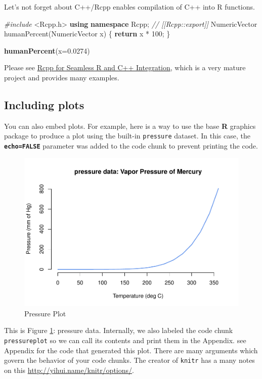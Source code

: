 \documentclass[12pt,oneside]{chicagocapstone}
\newenvironment{Shaded}{\begin{snugshade}}{\end{snugshade}}
\newcommand{\KeywordTok}[1]{\textcolor[rgb]{0.13,0.29,0.53}{\textbf{#1}}}
\newcommand{\DataTypeTok}[1]{\textcolor[rgb]{0.13,0.29,0.53}{#1}}
\newcommand{\DecValTok}[1]{\textcolor[rgb]{0.00,0.00,0.81}{#1}}
\newcommand{\FloatTok}[1]{\textcolor[rgb]{0.00,0.00,0.81}{#1}}
\newcommand{\ImportTok}[1]{#1}
\newcommand{\CommentTok}[1]{\textcolor[rgb]{0.56,0.35,0.01}{\textit{#1}}}
\newcommand{\ControlFlowTok}[1]{\textcolor[rgb]{0.13,0.29,0.53}{\textbf{#1}}}
\newcommand{\PreprocessorTok}[1]{\textcolor[rgb]{0.56,0.35,0.01}{\textit{#1}}}
\newcommand{\NormalTok}[1]{#1}
\begin{document}
Let's not forget about C++/Rcpp enables compilation of C++ into R
functions.
\begin{Shaded}
\begin{Highlighting}[]
\PreprocessorTok{#include }\ImportTok{<Rcpp.h>}
\KeywordTok{using} \KeywordTok{namespace}\NormalTok{ Rcpp;}
\CommentTok{// [[Rcpp::export]]}
\NormalTok{NumericVector humanPercent(NumericVector x) \{}
  \ControlFlowTok{return}\NormalTok{ x * }\DecValTok{100}\NormalTok{;}
\NormalTok{\}}
\end{Highlighting}
\end{Shaded}
\begin{Shaded}
\begin{Highlighting}[]
\KeywordTok{humanPercent}\NormalTok{(}\DataTypeTok{x=}\FloatTok{0.0274}\NormalTok{)}
\end{Highlighting}
\end{Shaded}
Please see \href{http://www.rcpp.org/}{Rcpp for Seamless R and C++
Integration}, which is a very mature project and provides many examples.

\newpage

\subsection*{Including plots}\label{pressure-plot}

You can also embed plots. For example, here is a way to use the base
\textbf{R} graphics package to produce a plot using the built-in
\texttt{pressure} dataset. In this case, the
\textbf{\texttt{echo=FALSE}} parameter was added to the code chunk to
prevent printing the code.
\begin{figure}
\centering
\includegraphics{UChicago-MScA-Capstone_files/figure-latex/pressureplot-1.pdf}
\caption{\label{fig:pressureplot}Pressure Plot}
\end{figure}
This is Figure \ref{fig:pressureplot}: pressure data. Internally, we
also labeled the code chunk \texttt{pressureplot} so we can call its
contents and print them in the Appendix. see Appendix for the code that
generated this plot. There are many arguments which govern the behavior
of your code chunks. The creator of \texttt{knitr} has a many notes on
this \url{http://yihui.name/knitr/options/}.
\end{document}

